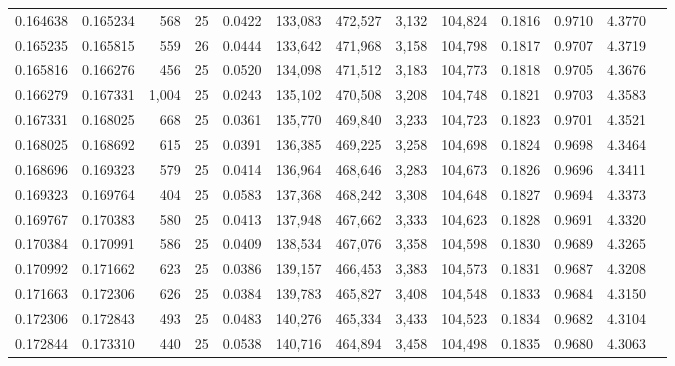 \begin{tabular}{rrrrrrrrrrrrr}
0.164638 & 0.165234 &   568 &  25 &                                     0.0422 & 133,083 & 472,527 &   3,132 & 104,824 & 0.1816 & 0.9710 & 4.3770 \\
0.165235 & 0.165815 &   559 &  26 &                                     0.0444 & 133,642 & 471,968 &   3,158 & 104,798 & 0.1817 & 0.9707 & 4.3719 \\
0.165816 & 0.166276 &   456 &  25 &                                     0.0520 & 134,098 & 471,512 &   3,183 & 104,773 & 0.1818 & 0.9705 & 4.3676 \\
0.166279 & 0.167331 & 1,004 &  25 &                                     0.0243 & 135,102 & 470,508 &   3,208 & 104,748 & 0.1821 & 0.9703 & 4.3583 \\
0.167331 & 0.168025 &   668 &  25 &                                     0.0361 & 135,770 & 469,840 &   3,233 & 104,723 & 0.1823 & 0.9701 & 4.3521 \\
0.168025 & 0.168692 &   615 &  25 &                                     0.0391 & 136,385 & 469,225 &   3,258 & 104,698 & 0.1824 & 0.9698 & 4.3464 \\
0.168696 & 0.169323 &   579 &  25 &                                     0.0414 & 136,964 & 468,646 &   3,283 & 104,673 & 0.1826 & 0.9696 & 4.3411 \\
0.169323 & 0.169764 &   404 &  25 &                                     0.0583 & 137,368 & 468,242 &   3,308 & 104,648 & 0.1827 & 0.9694 & 4.3373 \\
0.169767 & 0.170383 &   580 &  25 &                                     0.0413 & 137,948 & 467,662 &   3,333 & 104,623 & 0.1828 & 0.9691 & 4.3320 \\
0.170384 & 0.170991 &   586 &  25 &                                     0.0409 & 138,534 & 467,076 &   3,358 & 104,598 & 0.1830 & 0.9689 & 4.3265 \\
0.170992 & 0.171662 &   623 &  25 &                                     0.0386 & 139,157 & 466,453 &   3,383 & 104,573 & 0.1831 & 0.9687 & 4.3208 \\
0.171663 & 0.172306 &   626 &  25 &                                     0.0384 & 139,783 & 465,827 &   3,408 & 104,548 & 0.1833 & 0.9684 & 4.3150 \\
0.172306 & 0.172843 &   493 &  25 &                                     0.0483 & 140,276 & 465,334 &   3,433 & 104,523 & 0.1834 & 0.9682 & 4.3104 \\
0.172844 & 0.173310 &   440 &  25 &                                     0.0538 & 140,716 & 464,894 &   3,458 & 104,498 & 0.1835 & 0.9680 & 4.3063 \\

\end{tabular}

